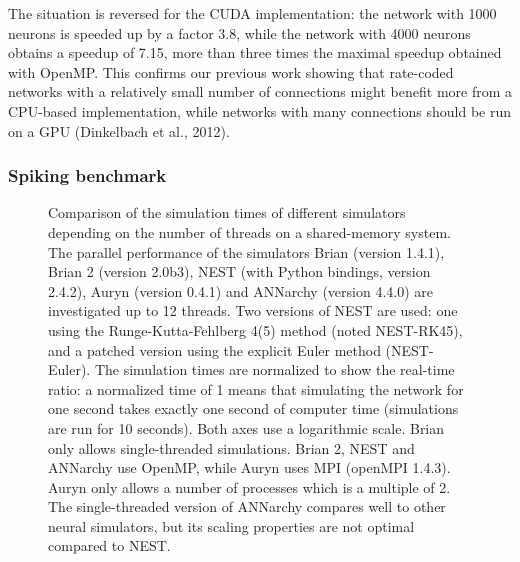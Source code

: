 \documentclass[
  11pt,
  a4paper,
]{scrbook}
\begin{document}
The situation is reversed for the CUDA implementation: the network with
1000 neurons is speeded up by a factor 3.8, while the network with 4000
neurons obtains a speedup of 7.15, more than three times the maximal
speedup obtained with OpenMP. This confirms our previous work showing
that rate-coded networks with a relatively small number of connections
might benefit more from a CPU-based implementation, while networks with
many connections should be run on a GPU (Dinkelbach et al., 2012).

\subsubsection*{Spiking benchmark}\label{spiking-benchmark}

\begin{figure}


\caption{\label{fig-fini:perf-spike}Comparison of the simulation times
of different simulators depending on the number of threads on a
shared-memory system. The parallel performance of the simulators Brian
(version 1.4.1), Brian 2 (version 2.0b3), NEST (with Python bindings,
version 2.4.2), Auryn (version 0.4.1) and ANNarchy (version 4.4.0) are
investigated up to 12 threads. Two versions of NEST are used: one using
the Runge-Kutta-Fehlberg 4(5) method (noted NEST-RK45), and a patched
version using the explicit Euler method (NEST-Euler). The simulation
times are normalized to show the real-time ratio: a normalized time of 1
means that simulating the network for one second takes exactly one
second of computer time (simulations are run for 10 seconds). Both axes
use a logarithmic scale. Brian only allows single-threaded simulations.
Brian 2, NEST and ANNarchy use OpenMP, while Auryn uses MPI (openMPI
1.4.3). Auryn only allows a number of processes which is a multiple of
2. The single-threaded version of ANNarchy compares well to other neural
simulators, but its scaling properties are not optimal compared to
NEST.}

\end{figure}%
\end{document}
